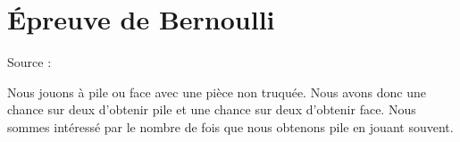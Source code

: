 
\section{Épreuve de Bernoulli}

Source : \cite{YDRqwN,ReQxlX,JqcbOc}

Nous jouons à pile ou face avec une pièce non truquée. Nous avons donc une chance sur deux d'obtenir pile et une chance sur deux d'obtenir face. Nous sommes intéressé par le nombre de fois que nous obtenons pile en jouant souvent.

